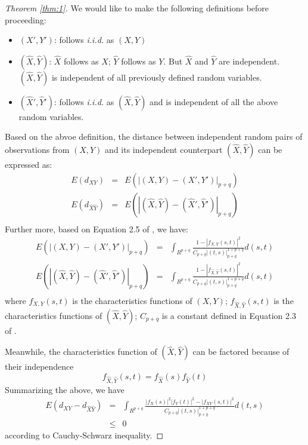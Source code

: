 \documentclass{sig-alternate}
\begin{document}
\begin{proof}[Theorem \ref{thm:1}]
  We would like to make the following definitions before proceeding:
  \begin{itemize}
  \item $(X', Y')$: follows \emph{i.i.d.} as $(X,Y)$
  \item $(\hat{X},\hat{Y})$: $\hat{X}$ follows \iid{} as $X$;
    $\hat{Y}$ follows \iid{} as $Y$. But $\hat{X}$ and $\hat{Y}$ are
    independent. $(\hat{X},\hat{Y})$ is independent of all previously
    defined random variables.
  \item $(\hat{X}', \hat{Y}')$: follows \emph{i.i.d.} as
    $(\hat{X},\hat{Y})$ and is independent of all the above random
    variables.
  \end{itemize}
  Based on the abvoe definition, the distance between independent
  random pairs of observations from $(X,Y)$ and its independent
  counterpart $(\hat{X}, \hat{Y})$ can be expressed as: 
  \begin{eqnarray*}
    E(d_{XY}) & = & E(|(X,Y) - (X', Y')|_{p+q})\\
    E(d_{\hat{X}\hat{Y}}) & = & E(|(\hat{X},\hat{Y}) - (\hat{X}', \hat{Y}')|_{p+q})\\
  \end{eqnarray*}
  Further more, based on Equation 2.5 of \cite{székely2007}, we have:
  \begin{eqnarray*}
    E(|(X,Y) - (X',Y')|_{p+q}) &=& \int_{R^{p+q}}
    \frac{1-|f_{X,Y}(s,t)|^2}{C_{p+q}|(t,s)|_{p+q}^{1+p+q}} d(s,t)\\
    E(|(\hat{X},\hat{Y}) - (\hat{X}',\hat{Y}')|_{p+q}) &=& \int_{R^{p+q}}
    \frac{1-|f_{\hat{X},\hat{Y}}(s,t)|^2}{C_{p+q}|(t,s)|_{p+q}^{1+p+q}} d(s,t)\\
  \end{eqnarray*}
  where $f_{X,Y}(s,t)$ is the characteristics functions of $(X,Y)$;
  $f_{\hat{X},\hat{Y}}(s,t)$ is the characteristics functions of
  $(\hat{X},\hat{Y})$; $C_{p+q}$ is a constant defined in Equation 2.3
  of \cite{székely2007}.

  Meanwhile, the characteristics function of $(\hat{X}, \hat{Y})$ can
  be factored because of their independence
  \begin{displaymath}
    f_{\hat{X},\hat{Y}}(s,t) = f_{\hat{X}}(s) f_{\hat{Y}}(t) 
  \end{displaymath}
  Summarizing the above, we have 
  \begin{eqnarray*}
    E(d_{XY} - d_{\hat{X}\hat{Y}})& =& \int_{R^{p+q}} \frac{|f_X(s)|^2
      |f_Y(t)|^2 - |f_{XY}(s,t)|^2}{C_{p+q}|(t,s)|_{p+q}^{1+p+q}}
    d(t,s)\\
    &\le & 0 
  \end{eqnarray*}
  according to Cauchy-Schwarz inequality. 
\end{proof}




\end{document}
